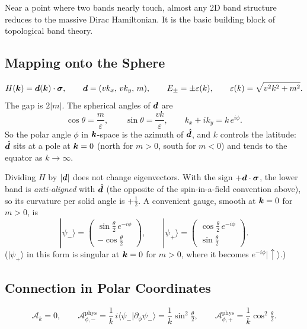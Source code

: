Near a point where two bands nearly touch, almost any 2D band structure reduces to the massive Dirac Hamiltonian. It is the basic building block of topological band theory.

\subsection{Mapping onto the Sphere}

\[
    H(\bm{k}) = \bm{d}(\bm{k})\cdot\bm{\sigma},
    \qquad
    \bm{d} = (vk_x,\,vk_y,\,m),
    \qquad
    E_\pm = \pm\varepsilon(k),
    \qquad
    \varepsilon(k) = \sqrt{v^2k^2+m^2}.
\]
The gap is $2|m|$. The spherical angles of $\bm{d}$ are
\[
    \cos\theta = \frac{m}{\varepsilon},
    \qquad
    \sin\theta = \frac{vk}{\varepsilon},
    \qquad
    k_x + ik_y = k\,e^{i\phi}.
\]
So the polar angle $\phi$ in $\bm{k}$-space is the azimuth of $\hat{\bm{d}}$, and $k$ controls the latitude: $\hat{\bm{d}}$ sits at a pole at $\bm{k} = 0$ (north for $m>0$, south for $m<0$) and tends to the equator as $k\to\infty$.

Dividing $H$ by $|\bm{d}|$ does not change eigenvectors. With the sign $+\bm{d}\cdot\bm{\sigma}$, the lower band is \emph{anti-aligned} with $\hat{\bm{d}}$ (the opposite of the spin-in-a-field convention above), so its curvature per solid angle is $+\frac12$. A convenient gauge, smooth at $\bm{k} = 0$ for $m>0$, is
\[
    |\psi_-\rangle = \begin{pmatrix}\sin\frac\theta2\,e^{-i\phi}\\[2pt] -\cos\frac\theta2\end{pmatrix},
    \qquad
    |\psi_+\rangle = \begin{pmatrix}\cos\frac\theta2\,e^{-i\phi}\\[2pt] \sin\frac\theta2\end{pmatrix}.
\]
($|\psi_+\rangle$ in this form is singular at $\bm{k} = 0$ for $m>0$, where it becomes $e^{-i\phi}|{\uparrow}\rangle$.)

\subsection{Connection in Polar Coordinates}

\[
    \mathcal{A}_k = 0,
    \qquad
    \mathcal{A}^{\text{phys}}_{\phi,-} = \frac1k\,i\langle\psi_-|\partial_\phi\psi_-\rangle = \frac1k\sin^2\tfrac\theta2,
    \qquad
    \mathcal{A}^{\text{phys}}_{\phi,+} = \frac1k\cos^2\tfrac\theta2 .
\]

